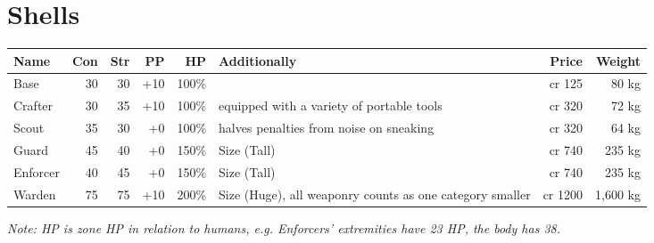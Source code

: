 \documentclass[12pt,a4paper,openany,usenames,dvipsnames]{book}
\begin{document}
	\section{Shells}
	\begin{tabularx}{\textwidth}{|l|r|r|r|r|X|r|r|}
		\hline
		Name & Con & Str & PP & HP & Additionally & Price & Weight \\ \hline
		Base & 30 & 30 & +10 & 100\% & & cr 125 & 80 kg \\ \hline
		Crafter & 30 & 35 & +10 & 100\% & equipped with a variety of portable tools & cr 320 & 72 kg \\ \hline
		Scout & 35 & 30 & +0 & 100\% & halves penalties from noise on sneaking & cr 320 & 64 kg \\ \hline
		Guard & 45 & 40 & +0 & 150\% & Size (Tall) & cr 740 & 235 kg \\ \hline
		Enforcer & 40 & 45 & +0 & 150\% & Size (Tall) & cr 740 & 235 kg \\ \hline
		Warden & 75 & 75 & +10 & 200\% & Size (Huge), all weaponry counts as one category smaller & cr 1200 & 1,600 kg \\ \hline
	\end{tabularx}
	\par \vspace{-8mm}
	\textit{Note: HP is zone HP in relation to humans, e.g. Enforcers' extremities have 23 HP, the body has 38.}
\end{document}
